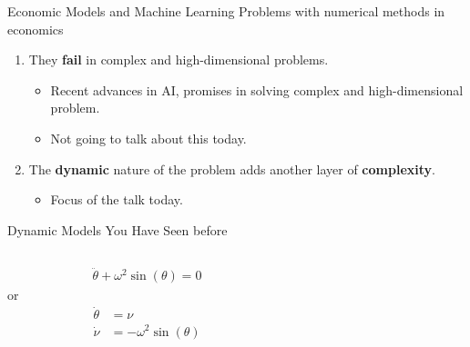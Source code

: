 \documentclass[aspectratio=169,10pt]{beamer}
\newcommand{\emphcolor}[1]{\textbf{\textcolor{emphcolorval}{#1}}}
\begin{document}
\begin{frame}{Economic Models and Machine Learning}
	Problems with numerical methods in economics
	\begin{enumerate}
		\item They \emphcolor{fail} in complex and high-dimensional problems.
		\vspace{0.025in}
		\begin{itemize}
			\item Recent advances in AI, promises in solving complex and high-dimensional problem. 
			\vspace{0.025in}
			\item Not going to talk about this today.
		\end{itemize}
		\vspace{0.025in}
		\item The \emphcolor{dynamic} nature of the problem adds another layer of \emphcolor{complexity}.
		\begin{itemize}
			\vspace{0.025in}
			\item Focus of the talk today.
		\end{itemize}
	\end{enumerate}
\end{frame}

\begin{frame}{Dynamic Models You Have Seen before}
	\begin{columns}
		\begin{column}{0.8\textwidth}
			\begin{align*}
				\ddot{\theta}+ \omega^2 \sin(\theta) = 0
			\end{align*}
			\quad \quad \quad or 
			\begin{align*}
				\dot{\theta} &= \nu\\
				\dot{\nu} &= -\omega^2 \sin(\theta)
			\end{align*}
		\end{column}
		\begin{column}{0.2\textwidth}

		\end{column}
	\end{columns}
\end{frame}
\end{document}
